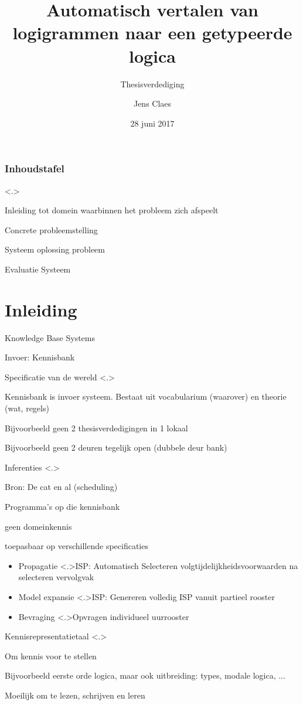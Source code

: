 \documentclass[notes, dvipsnames]{beamer}
\title{Automatisch vertalen van logigrammen naar een getypeerde logica}
\subtitle{Thesisverdediging}
\author{Jens Claes}
\date{28 juni 2017}
\newcommand{\seperation}{
	\vspace{1em}
	\ppause
}
\newcommand{\hitem}{
	\ppause
	\item
}
\newcommand{\ppause}{\onslide<+>}
\newcommand{\nnote}[1]{\note<.>{#1}}
\begin{document}
	\frame{\titlepage}

  \begin{frame}
    \frametitle{Inhoudstafel}
    \tableofcontents[hidesubsections] 
    \nnote{
      \item Inleiding tot domein waarbinnen het probleem zich afspeelt
      \item Concrete probleemstelling
      \item Systeem oplossing probleem
      \item Evaluatie Systeem
    }
  \end{frame}

  \section{Inleiding}
	\begin{frame}{Knowledge Base Systems}
		\begin{itemize}
      \hitem Invoer: Kennisbank
      \item Specificatie van de wereld
      \nnote{
        \item Kennisbank is invoer systeem. Bestaat uit vocabularium (waarover) en theorie (wat, regels)
        \item Bijvoorbeeld geen 2 thesisverdedigingen in 1 lokaal
        \item Bijvoorbeeld geen 2 deuren tegelijk open (dubbele deur bank)
      }

			\seperation
      \item Inferenties \cite{idp}
        \nnote{
          \item Bron: De cat en al (scheduling)
          \item Programma's op die kennisbank
          \item geen domeinkennis
          \item toepasbaar op verschillende specificaties
        }
        \begin{itemize}
          \hitem Propagatie \nnote{ISP: Automatisch Selecteren volgtijdelijkheidsvoorwaarden na selecteren vervolgvak}
          \hitem Model expansie \nnote{ISP: Genereren volledig ISP vanuit partieel rooster}
          \hitem Bevraging \nnote{Opvragen individueel uurrooster}
        \end{itemize}

      \seperation
      \item Kennisrepresentatietaal
      \nnote{
        \item Om kennis voor te stellen
        \item Bijvoorbeeld eerste orde logica, maar ook uitbreiding: types, modale logica, ...
        \item Moeilijk om te lezen, schrijven en leren
      }
		\end{itemize}
	\end{frame}
\end{document}
